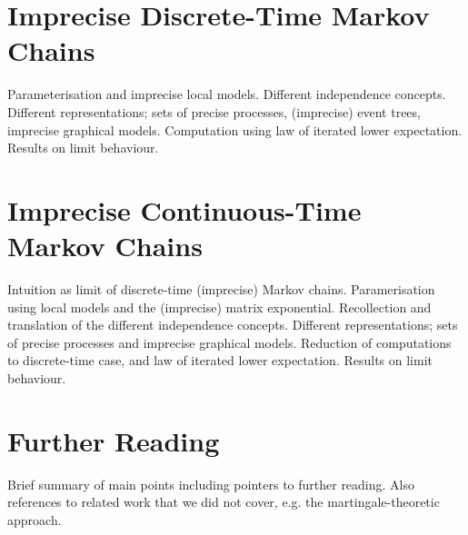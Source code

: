 \documentclass[11pt]{article}
\begin{document}
\section{Imprecise Discrete-Time Markov Chains}
Parameterisation and imprecise local models. Different independence concepts. Different representations; sets of precise processes, (imprecise) event trees, imprecise graphical models. Computation using law of iterated lower expectation. Results on limit behaviour.

\section{Imprecise Continuous-Time Markov Chains}
Intuition as limit of discrete-time (imprecise) Markov chains. Paramerisation using local models and the (imprecise) matrix exponential. Recollection and translation of the different independence concepts. Different representations; sets of precise processes and imprecise graphical models. Reduction of computations to discrete-time case, and law of iterated lower expectation. Results on limit behaviour.

\section{Further Reading}
Brief summary of main points including pointers to further reading. Also references to related work that we did not cover, e.g. the martingale-theoretic approach.
\end{document}
